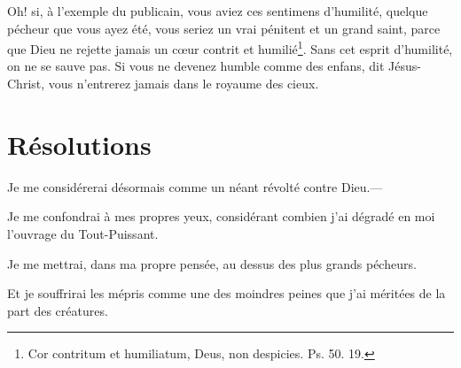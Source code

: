 \documentclass[instructions.tex]{subfiles}
\begin{document}
Oh! si, à l’exemple du publicain, vous aviez ces sentimens d’humilité, quelque pécheur que vous ayez été, vous seriez un vrai pénitent et un grand saint, parce que Dieu ne rejette jamais un cœur contrit et humilié\footnote{Cor contritum et humiliatum, Deus, non despicies. Ps. 50. 19.}. Sans cet esprit d’humilité, on ne se sauve pas. Si vous ne devenez humble comme des enfans, dit Jésus-Christ, vous n’entrerez jamais dans le royaume des cieux.
 
\section{Résolutions}
 
\primo Je me considérerai désormais comme un néant révolté contre Dieu.—

\secundo Je me confondrai à mes propres yeux, considérant combien j'ai dégradé en moi l'ouvrage du Tout-Puissant.

\tertio Je me mettrai, dans ma propre pensée, au dessus des plus grands pécheurs.

\quarto Et je souffrirai les mépris comme une des moindres peines que j'ai méritées de la part des créatures. 

 
\end{document}
